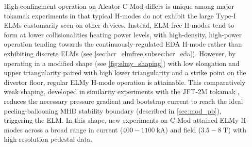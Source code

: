 High-confinement operation on Alcator C-Mod differs is unique among major tokamak experiments in that typical H-modes do not exhibit the large Type-I ELMs customarily seen on other devices.  Instead, ELM-free H-modes tend to form at lower collisionalities heating power levels, with high-density, high-power operation tending towards the continuously-regulated EDA H-mode rather than exhibiting discrete ELMs (see \cref{sec:hcr_elmfree,subsec:hcr_eda}).  However, by operating in a modified shape (see \cref{fig:elmy_shaping}) with low elongation and upper triangularity paired with high lower triangularity and a strike point on the divertor floor, regular ELMy H-mode operation is attainable.  This comparatively weak shaping, developed in similarity experiments with the JFT-2M tokamak \cite{Hughes2011}, reduces the necessary pressure gradient and bootstrap current to reach the ideal peeling-ballooning MHD stability boundary (described in \cref{sec:mod_pb}), triggering the ELM.  In this shape, new experiments on C-Mod \cite{Walk2012} attained ELMy H-modes across a broad range in current ($400-1100 \;\si{\kilo\ampere}$) and field ($3.5-8 \;\si{\tesla}$) with high-resolution pedestal data.

\begin{figure}[t]
 \pushtooutside
\end{figure}

